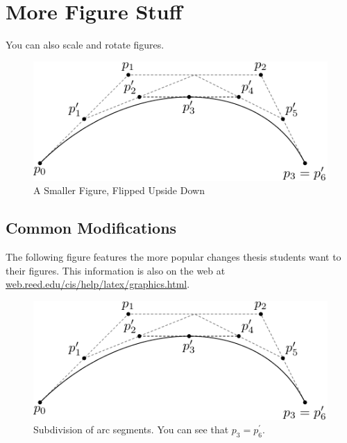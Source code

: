 \documentclass[12pt,twoside]{reedthesis}
\begin{document}
\clearpage %

\section{More Figure Stuff}
You can also scale and rotate figures.
 	\begin{figure}[h!]
	   
	       \centering
	    \includegraphics[scale=0.5,angle=180]{subdivision}
	     \caption{A Smaller Figure, Flipped Upside Down}
	 \label{subd2}
	\end{figure}
	
      \subsection{Common Modifications}
      The following figure features the more popular changes thesis students want to their figures. This information is also on the web at \url{web.reed.edu/cis/help/latex/graphics.html}.
    \begin{figure}[htbp]
    \begin{center}
   \includegraphics[scale=0.5]{subdivision}
    \caption[Subdivision of arc segments]{\footnotesize{Subdivision of arc segments. You can see that $ p_3 = p_6^\prime$.}} %
    \label{barplot}
    \end{center}
    \end{figure} 
\end{document}
